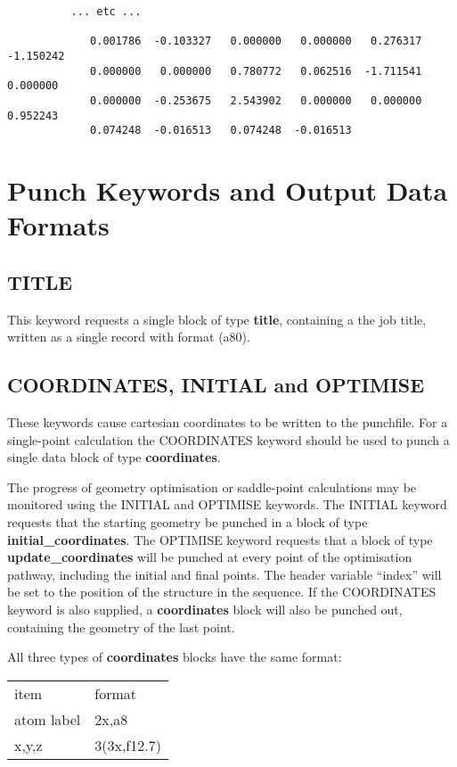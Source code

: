 \documentclass[11pt,fleqn]{article}
\begin{document}
{\begin{verbatim}
          ... etc ...
          
             0.001786  -0.103327   0.000000   0.000000   0.276317  -1.150242
             0.000000   0.000000   0.780772   0.062516  -1.711541   0.000000
             0.000000  -0.253675   2.543902   0.000000   0.000000   0.952243
             0.074248  -0.016513   0.074248  -0.016513
\end{verbatim}
}


\section[Punch Keywords and Output Data Formats]{Punch Keywords and Output Data Formats}

\subsection[TITLE]{TITLE}

This keyword requests a single block of type {\bf title}, containing
a the job title, written as a single record with format (a80).

\subsection[COORDINATES, INITIAL and OPTIMISE]{COORDINATES, INITIAL and OPTIMISE}

These keywords cause cartesian coordinates to be written to the 
punchfile. For a single-point calculation the COORDINATES keyword 
should be used to punch a single data block of type {\bf coordinates}. 

The progress of geometry optimisation or saddle-point calculations
may be monitored using the INITIAL and OPTIMISE keywords. The INITIAL
keyword requests that the starting geometry be punched in a block of
type {\bf initial\_coordinates}. The OPTIMISE keyword requests that a block
of type {\bf update\_coordinates} will be punched at every point of the 
optimisation pathway, including the initial and final points. The header variable
``index''  will be set to the position of the structure in the sequence.
If the COORDINATES keyword is also supplied,
a {\bf coordinates} block will also be punched out, containing the 
geometry of the last point. 

All three types of {\bf coordinates} blocks have the same format:

 \begin{centering}
 \begin{tabular}{ll}
\\ \hline
  item         & format\\ \cline{1-2}
atom label &   2x,a8 \\
x,y,z      &   3(3x,f12.7)\\
\hline
 \end{tabular}
 
 \end{centering}
\end{document}
